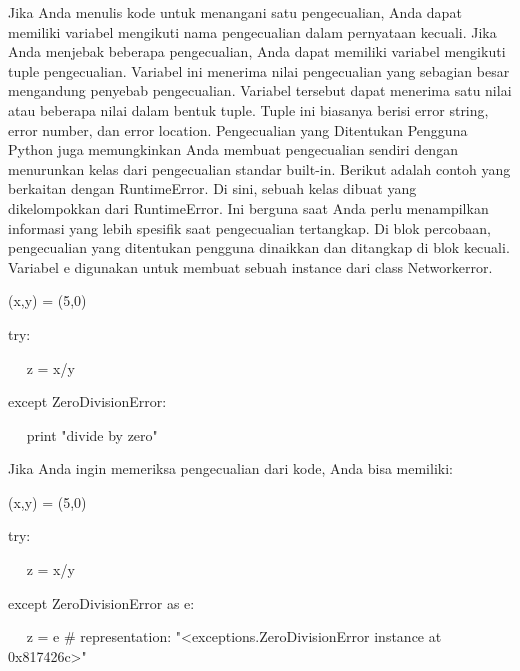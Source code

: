  \hspace*{0.5in} Jika Anda menulis kode untuk menangani satu pengecualian, Anda dapat memiliki variabel mengikuti nama pengecualian dalam pernyataan kecuali. Jika Anda menjebak beberapa pengecualian, Anda dapat memiliki variabel mengikuti tuple pengecualian. Variabel ini menerima nilai pengecualian yang sebagian besar mengandung penyebab pengecualian. Variabel tersebut dapat menerima satu nilai atau beberapa nilai dalam bentuk tuple. Tuple ini biasanya berisi error string, error number, dan error location. Pengecualian yang Ditentukan Pengguna Python juga memungkinkan Anda membuat pengecualian sendiri dengan menurunkan kelas dari pengecualian standar built-in. Berikut adalah contoh yang berkaitan dengan RuntimeError. Di sini, sebuah kelas dibuat yang dikelompokkan dari RuntimeError. Ini berguna saat Anda perlu menampilkan informasi yang lebih spesifik saat pengecualian tertangkap. Di blok percobaan, pengecualian yang ditentukan pengguna dinaikkan dan ditangkap di blok kecuali. Variabel e digunakan untuk membuat sebuah instance dari class Networkerror. 
\vspace{12pt}

{\fontsize{10pt}{10pt}\selectfont  (x,y) = (5,0)} 

{\fontsize{10pt}{10pt}\selectfont  try:} 

{\fontsize{10pt}{10pt}\selectfont ~~ z = x/y} 


{\fontsize{10pt}{10pt}\selectfont  except ZeroDivisionError:}


{\fontsize{10pt}{10pt}\selectfont ~~ print "divide by zero"} 

\vspace{10pt}

Jika Anda ingin memeriksa pengecualian dari kode, Anda bisa memiliki: 

\vspace{12pt}
 
\vspace{12pt}

\vspace{12pt}

{\fontsize{10pt}{10pt}\selectfont  (x,y) = (5,0)} 


{\fontsize{10pt}{10pt}\selectfont  try:} 


{\fontsize{10pt}{10pt}\selectfont ~~ z = x/y} 


{\fontsize{10pt}{10pt}\selectfont  except ZeroDivisionError as e:} 

{\fontsize{10pt}{10pt}\selectfont ~~ z = e  $  \#  $ representation: "<exceptions.ZeroDivisionError instance at 0x817426c>"} 


